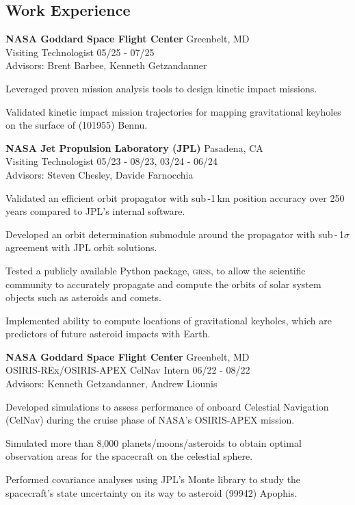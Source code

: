 \documentclass[margin,line]{res}
\newlength{\myitemspacing}
\newenvironment{list_new}{
    \begin{list}{\scriptsize{$\bullet$}}{%
        \setlength{\itemsep}{0in}
        \setlength{\parsep}{\myitemspacing} \setlength{\parskip}{0in}
        \setlength{\topsep}{0in} \setlength{\partopsep}{0in} 
        \setlength{\leftmargin}{0.2in}
        }}
    {\end{list}
}
\begin{document}
\begin{resume}
\section{\sc Work Experience}
{\bf NASA Goddard Space Flight Center} \hfill Greenbelt, MD\\
Visiting Technologist \hfill 05/25 - 07/25\\
Advisors: Brent Barbee, Kenneth Getzandanner
\begin{list_new}
    \item Leveraged proven mission analysis tools to design kinetic impact missions.
    \item Validated kinetic impact mission trajectories for mapping gravitational keyholes on the surface of (101955) Bennu.
\end{list_new}
{\bf NASA Jet Propulsion Laboratory (JPL)} \hfill Pasadena, CA\\
Visiting Technologist \hfill 05/23 - 08/23, 03/24 - 06/24\\
Advisors: Steven Chesley, Davide Farnocchia
\begin{list_new}
    \item Validated an efficient orbit propagator with sub\,-1\,km position accuracy over 250 years compared to JPL's internal software.
    \item Developed an orbit determination submodule around the propagator with sub\,-\,1$\sigma$ agreement with JPL orbit solutions.
    \item Tested a publicly available Python package, \textsc{grss}, to allow the scientific community to accurately propagate and compute the orbits of solar system objects such as asteroids and comets.
    \item Implemented ability to compute locations of gravitational keyholes, which are predictors of future asteroid impacts with Earth.
\end{list_new}
{\bf NASA Goddard Space Flight Center} \hfill Greenbelt, MD\\
OSIRIS-REx/OSIRIS-APEX CelNav Intern \hfill 06/22 - 08/22\\
Advisors: Kenneth Getzandanner, Andrew Liounis
\begin{list_new}
    \item Developed simulations to assess performance of onboard Celestial Navigation (CelNav) during the cruise phase of NASA's OSIRIS-APEX mission.
    \item Simulated more than 8,000 planets/moons/asteroids to obtain optimal observation areas for the spacecraft on the celestial sphere.
    \item Performed covariance analyses using JPL's Monte library to study the spacecraft's state uncertainty on its way to asteroid (99942) Apophis.
\end{list_new}


\end{resume}
\end{document}
